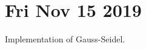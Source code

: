 \documentclass[main.tex]{subfiles}
\begin{document}
\section*{Fri Nov 15 2019}

Implementation of Gauss-Seidel.
\end{document}

